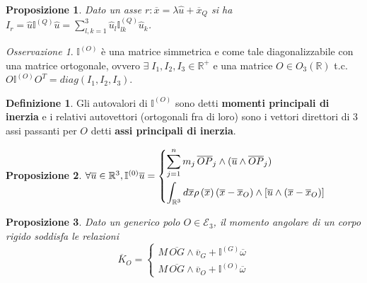 \documentclass{book}
\theoremstyle{plain}
\theoremstyle{plain}
\theoremstyle{plain}
\theoremstyle{plain}
\theoremstyle{plain}
\newtheorem{prop}{Proposizione}[chapter]
\theoremstyle{definition}
\newtheorem{defi}{Definizione}[chapter]
\theoremstyle{remark}
\newtheorem*{oss}{Osservazione}
\theoremstyle{definition}
\begin{document}
\begin{prop}
\everymath{\displaystyle}
    Dato un asse $r: \overline{x}=\lambda\hat{u}+\overline{x}_Q$ si ha $I_r = \hat{u}\mathbb{I}^{(Q)}\hat{u} = \sum_{l,k=1}^3\hat{u}_l\mathbb{I}^{(Q)}_{lk}\hat{u}_k$.
\end{prop}

\begin{oss}
    $\mathbb{I}^{(O)}$ è una matrice simmetrica e come tale diagonalizzabile con una matrice ortogonale, ovvero $\exists \; I_1,I_2,I_3 \in \mathbb{R}^+$ e una matrice $O \in O_3(\mathbb{R})$ t.c. $O\mathbb{I}^{(O)}O^T=diag(I_1,I_2,I_3)$.
\end{oss}

\begin{defi}
   Gli autovalori di $\mathbb{I}^{(O)}$  sono detti \textbf{momenti principali di inerzia} e i relativi autovettori (ortogonali fra di loro) sono i vettori direttori di 3 assi passanti per $O$ detti \textbf{assi principali di inerzia}.
\end{defi}

\begin{prop}
    $\forall \overline{u}\in\mathbb{R}^3, \mathbb{I}^{(0)}\overline{u}=
    \begin{dcases}
        \sum^n_{j=1}m_j\,\overline{OP}_j\wedge(\overline{u}\wedge\overline{OP}_j) \\
        \int_{\mathbb{R}^3} d\overline{x} \rho \left(\overline{x}\right) \left(\overline{x}-\overline{x}_O\right)\wedge\left[\overline{u}\wedge\left(\overline{x}-\overline{x}_O\right)\right]
    \end{dcases}$
\end{prop}

\begin{prop}
    Dato un generico polo $O \in \mathcal{E}_3$, il momento angolare di un corpo rigido soddisfa le relazioni
    \begin{displaymath}
    \boxed{
        \overline{K}_O=
        \begin{cases}
            M\,\overline{OG}\wedge\overline{v}_G +\mathbb{I}^{(G)}\overline{\omega} \\
            M\,\overline{OG}\wedge\overline{v}_O +\mathbb{I}^{(O)}\overline{\omega}
        \end{cases}
        }
    \end{displaymath}
\end{prop}
\end{document}

